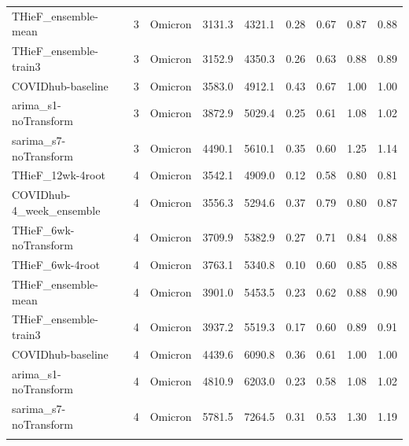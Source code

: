 \documentclass[thesis]{umassthesis}  %
\begin{document}
\begin{longtable}{lrlrrrrrr}
  THieF\_ensemble-mean & 3 & Omicron & 3131.3 & 4321.1 & 0.28 & 0.67 & 0.87 & 0.88 \\ 
  THieF\_ensemble-train3 & 3 & Omicron & 3152.9 & 4350.3 & 0.26 & 0.63 & 0.88 & 0.89 \\ 
  COVIDhub-baseline & 3 & Omicron & 3583.0 & 4912.1 & 0.43 & 0.67 & 1.00 & 1.00 \\ 
  arima\_s1-noTransform & 3 & Omicron & 3872.9 & 5029.4 & 0.25 & 0.61 & 1.08 & 1.02 \\ 
  sarima\_s7-noTransform & 3 & Omicron & 4490.1 & 5610.1 & 0.35 & 0.60 & 1.25 & 1.14 \\ 
  THieF\_12wk-4root & 4 & Omicron & 3542.1 & 4909.0 & 0.12 & 0.58 & 0.80 & 0.81 \\ 
  COVIDhub-4\_week\_ensemble & 4 & Omicron & 3556.3 & 5294.6 & 0.37 & 0.79 & 0.80 & 0.87 \\ 
  THieF\_6wk-noTransform & 4 & Omicron & 3709.9 & 5382.9 & 0.27 & 0.71 & 0.84 & 0.88 \\ 
  THieF\_6wk-4root & 4 & Omicron & 3763.1 & 5340.8 & 0.10 & 0.60 & 0.85 & 0.88 \\ 
  THieF\_ensemble-mean & 4 & Omicron & 3901.0 & 5453.5 & 0.23 & 0.62 & 0.88 & 0.90 \\ 
  THieF\_ensemble-train3 & 4 & Omicron & 3937.2 & 5519.3 & 0.17 & 0.60 & 0.89 & 0.91 \\ 
  COVIDhub-baseline & 4 & Omicron & 4439.6 & 6090.8 & 0.36 & 0.61 & 1.00 & 1.00 \\ 
  arima\_s1-noTransform & 4 & Omicron & 4810.9 & 6203.0 & 0.23 & 0.58 & 1.08 & 1.02 \\ 
  sarima\_s7-noTransform & 4 & Omicron & 5781.5 & 7264.5 & 0.31 & 0.53 & 1.30 & 1.19 \\ 
   \hline
\hline
\label{tab:table_wave_us}
\end{longtable}
\endgroup%


\backmatter  %




\end{document}
